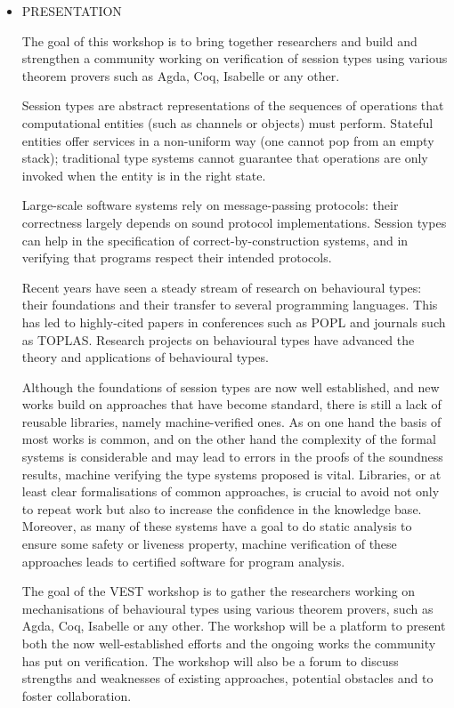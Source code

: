 \documentclass[prodmode,acmtecs]{acmsmall} %
\begin{document}
\begin{itemize}\item  PRESENTATION 
 
  The goal of this workshop is to bring together researchers and build and strengthen a community working on verification of session types using various theorem provers such as Agda, Coq, Isabelle or any other. 
 
  Session types are abstract representations of the sequences of operations that computational entities (such as channels or objects) must perform. Stateful entities offer services in a non-uniform way (one cannot pop from an empty stack); traditional type systems cannot guarantee that operations are only invoked when the entity is in the right state. 
 
  Large-scale software systems rely on message-passing protocols: their correctness largely depends on sound protocol implementations. Session types can help in the specification of correct-by-construction systems, and in verifying that programs respect their intended protocols. 
 
  Recent years have seen a steady stream of research on behavioural types: their foundations and their transfer to several programming languages. This has led to highly-cited papers in conferences such as POPL and journals such as TOPLAS. Research projects on behavioural types have advanced the theory and applications of behavioural types. 
 
  Although the foundations of session types are now well established, and new works build on approaches that have become standard, there is still a lack of reusable libraries, namely machine-verified ones. As on one hand the basis of most works is common, and on the other hand the complexity of the formal systems is considerable and may lead to errors in the proofs of the soundness results, machine verifying the type systems proposed is vital. Libraries, or at least clear formalisations of common approaches, is crucial to avoid not only to repeat work but also to increase the confidence in the knowledge base. Moreover, as many of these systems have a goal to do static analysis to ensure some safety or liveness property, machine verification of these approaches leads to certified software for program analysis. 
 
  The goal of the VEST workshop is to gather the researchers working on mechanisations of behavioural types using various theorem provers, such as Agda, Coq, Isabelle or any other. The workshop will be a platform to present both the now well-established efforts and the ongoing works the community has put on verification. The workshop will also be a forum to discuss strengths and weaknesses of existing approaches, potential obstacles and to foster collaboration. 
 

\end{itemize}
\end{document}
